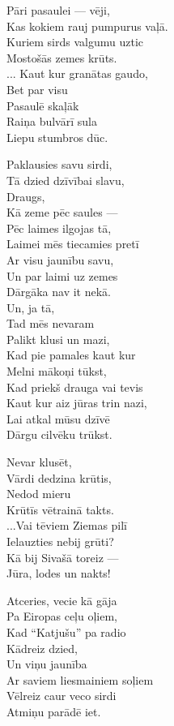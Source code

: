 \documentclass[14pt]{extarticle}
\begin{document}
{{Pāri pasaulei --- vēji,\\
Kas kokiem rauj pumpurus vaļā.\\
Kuriem sirds valgumu uztic\\
Mostošās zemes krūts.\\
... Kaut kur granātas gaudo,\\
Bet par visu\\
Pasaulē skaļāk\\
Raiņa bulvārī sula\\
Liepu stumbros dūc. 

Paklausies savu sirdi,\\
Tā dzied dzīvībai slavu,\\
Draugs,\\
Kā zeme pēc saules ---\\
Pēc laimes ilgojas tā,\\
Laimei mēs tiecamies pretī\\
Ar visu jaunību savu,\\
Un par laimi uz zemes\\
Dārgāka nav it nekā.\\
Un, ja tā,\\
Tad mēs nevaram\\
Palikt klusi un mazi,\\
Kad pie pamales kaut kur\\
Melni mākoņi tūkst,\\
Kad priekš drauga vai tevis\\
Kaut kur aiz jūras trin nazi,\\
Lai atkal mūsu dzīvē\\
Dārgu cilvēku trūkst. 

Nevar klusēt,\\
Vārdi dedzina krūtis,\\
Nedod mieru\\
Krūtīs vētrainā takts.\\
...Vai tēviem Ziemas pilī\\
Ielauzties nebij grūti?\\
Kā bij Sivašā toreiz ---\\
Jūra, lodes un nakts!

Atceries, vecie kā gāja\\
Pa Eiropas ceļu oļiem,\\
Kad ``Katjušu'' pa radio\\
Kādreiz dzied,\\
Un viņu jaunība\\
Ar saviem liesmainiem soļiem\\
Vēlreiz caur veco sirdi\\
Atmiņu parādē iet. 

}}
\end{document}
